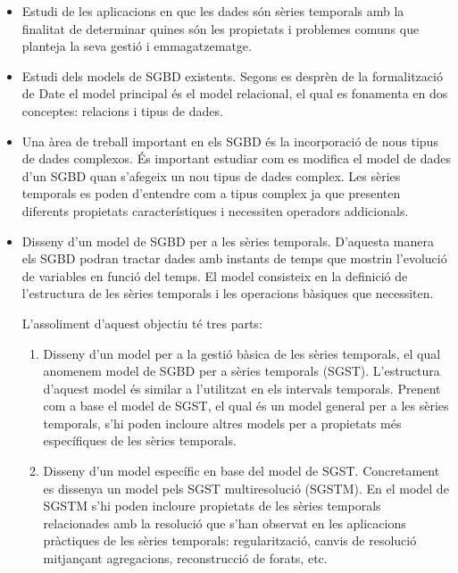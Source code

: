 \begin{itemize}

\item Estudi de les aplicacions en que les dades són sèries temporals
  amb la finalitat de determinar quines són les propietats i problemes
  comuns que planteja la seva gestió i emmagatzematge.

\item Estudi dels models de SGBD existents. Segons es desprèn de la
  formalització de Date%
  el model principal és el model relacional, el qual es fonamenta en
  dos conceptes: relacions i tipus de dades.

\item Una àrea de treball important en els SGBD és la incorporació de
  nous tipus de dades complexos. És important estudiar com es modifica
  el model de dades d'un SGBD quan s'afegeix un nou tipus de dades
  complex.  Les sèries temporals es poden d'entendre com a tipus
  complex ja que presenten diferents propietats característiques i
  necessiten operadors addicionals.  

\item Disseny d'un model de SGBD per a les sèries temporals. D'aquesta
  manera els SGBD podran tractar dades amb instants de temps que
  mostrin l'evolució de variables en funció del temps. El model
  consisteix en la definició de l'estructura de les sèries temporals i
  les operacions bàsiques que necessiten.

  L'assoliment d'aquest objectiu té tres parts:

  \begin{enumerate}
  \item Disseny d'un model per a la gestió bàsica de les sèries
    temporals, el qual anomenem model de SGBD per a sèries temporals
    (SGST).  L'estructura d'aquest model és similar a l'utilitzat en
    els intervals
    temporals. %
    Prenent com a base el model de SGST, el qual és un model general
    per a les sèries temporals, s'hi poden incloure altres models per
    a propietats més específiques de les sèries temporals.

  \item Disseny d'un model específic en base del model de
    SGST. Concretament es dissenya un model pels SGST multiresolució
    (SGSTM).  En el model de SGSTM s'hi poden incloure propietats de
    les sèries temporals relacionades amb la resolució que s'han
    observat en les aplicacions pràctiques de les sèries temporals:
    regularització, canvis de resolució mitjançant agregacions,
    reconstrucció de forats, etc.




\end{enumerate}
\end{itemize}
